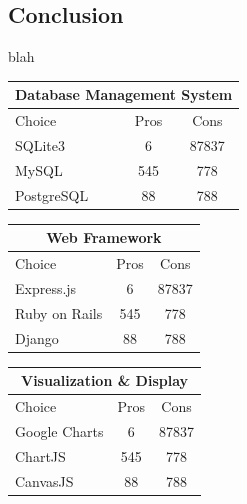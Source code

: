 \documentclass[onecolumn, draftclsnofoot,10pt, compsoc]{IEEEtran}
\begin{document}
\begin{singlespace}
\subsection{Conclusion}
blah

\begin{center}
 \begin{tabular}{|l|c|c|} 
 \hline
 \multicolumn{3}{|c|}{Database Management System} \\
 \hline
 Choice & Pros & Cons\\ [0.5ex] 
 \hline\hline
 SQLite3 & 6 & 87837 \\ 
 \hline
 MySQL & 545 & 778\\
 \hline
 PostgreSQL & 88 & 788\\ [1ex] 
 \hline
\end{tabular}
 \begin{tabular}{|l|c|c|} 
 \hline
 \multicolumn{3}{|c|}{Web Framework} \\
 \hline
 Choice & Pros & Cons\\ [0.5ex] 
 \hline\hline
 Express.js & 6 & 87837 \\ 
 \hline
 Ruby on Rails & 545 & 778\\
 \hline
 Django & 88 & 788\\ [1ex] 
 \hline
\end{tabular}
 \begin{tabular}{|l|c|c|} 
 \hline
 \multicolumn{3}{|c|}{Visualization \& Display} \\
 \hline
 Choice & Pros & Cons\\ [0.5ex] 
 \hline\hline
 Google Charts & 6 & 87837 \\ 
 \hline
 ChartJS & 545 & 778\\
 \hline
 CanvasJS & 88 & 788\\ [1ex] 
 \hline
\end{tabular}
\end{center}





\end{singlespace}
\end{document}
